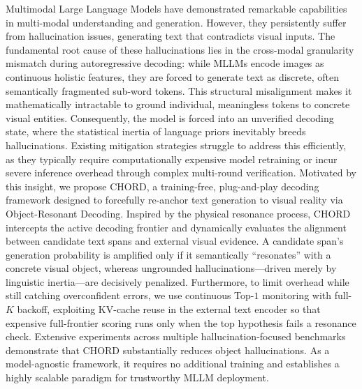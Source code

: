 Multimodal Large Language Models have demonstrated remarkable capabilities in multi-modal understanding and generation. However, they persistently suffer from hallucination issues, generating text that contradicts visual inputs. The fundamental root cause of these hallucinations lies in the cross-modal granularity mismatch during autoregressive decoding: while MLLMs encode images as continuous holistic features, they are forced to generate text as discrete, often semantically fragmented sub-word tokens. This structural misalignment makes it mathematically intractable to ground individual, meaningless tokens to concrete visual entities. Consequently, the model is forced into an unverified decoding state, where the statistical inertia of language priors inevitably breeds hallucinations. Existing mitigation strategies struggle to address this efficiently, as they typically require computationally expensive model retraining or incur severe inference overhead through complex multi-round verification. Motivated by this insight, we propose CHORD, a training-free, plug-and-play decoding framework designed to forcefully re-anchor text generation to visual reality via Object-Resonant Decoding. Inspired by the physical resonance process, CHORD intercepts the active decoding frontier and dynamically evaluates the alignment between candidate text spans and external visual evidence. A candidate span's generation probability is amplified only if it semantically ``resonates'' with a concrete visual object, whereas ungrounded hallucinations---driven merely by linguistic inertia---are decisively penalized. Furthermore, to limit overhead while still catching overconfident errors, we use continuous Top-$1$ monitoring with full-$K$ backoff, exploiting KV-cache reuse in the external text encoder so that expensive full-frontier scoring runs only when the top hypothesis fails a resonance check. Extensive experiments across multiple hallucination-focused benchmarks demonstrate that CHORD substantially reduces object hallucinations. As a model-agnostic framework, it requires no additional training and establishes a highly scalable paradigm for trustworthy MLLM deployment.
